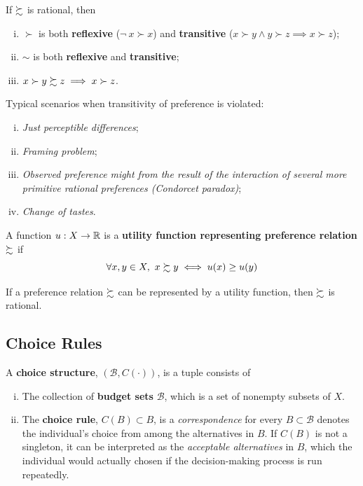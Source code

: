 \documentclass{report}
\begin{document}
		\begin{proposition}[1.B.1]
			If $\succsim$ is rational, then
			\begin{enumerate}[(i)]
				\item $\succ$ is both \textbf{reflexive} ($\neg\ x \succ x$) and \textbf{transitive} ($x \succ y \land y \succ z \implies x \succ z$);
				\item $\sim$ is both \textbf{reflexive} and \textbf{transitive};
				\item $x \succ y \succsim z \implies x \succ z$.
			\end{enumerate}
		\end{proposition}
		
		\begin{example}
			Typical scenarios when transitivity of preference is violated:
			\begin{enumerate}[(i)]
				\item \emph{Just perceptible differences};
				\item \emph{Framing problem};
				\item \emph{Observed preference might from the result of the interaction of several more primitive rational preferences (Condorcet paradox)};
				\item \emph{Change of tastes}.
			\end{enumerate}
		\end{example}
		
		\begin{definition}[1.B.2]
			A function $u: X \to \mathbb{R}$ is a \textbf{utility function representing preference relation} $\succsim$ if
			\begin{equation}
				\forall x, y \in X,\ x \succsim y \iff u(x) \geq u(y)
			\end{equation}
		\end{definition}
		
		\begin{proposition}[1.B.2]
			If a preference relation $\succsim$ can be represented by a utility function, then $\succsim$ is rational.
		\end{proposition}
	
	\subsection{Choice Rules}
		\begin{definition}
			A \textbf{choice structure}, $(\mathscr{B}, C(\cdot))$, is a tuple consists of
			\begin{enumerate}[(i)]
				\item The collection of \textbf{budget sets} $\mathscr{B}$, which is a set of nonempty subsets of $X$.
				\item The \textbf{choice rule}, $C(B) \subset B$, is a \emph{correspondence} for every $B \subset \mathscr{B}$ denotes the individual's choice from among the alternatives in $B$. If $C(B)$ is not a singleton, it can be interpreted as the \emph{acceptable alternatives} in $B$, which the individual would actually chosen if the decision-making process is run repeatedly. 
			\end{enumerate}
		\end{definition}
		
\end{document}
